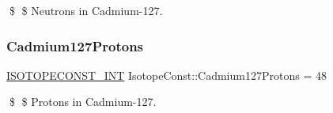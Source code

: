 \$ \$ Neutrons in Cadmium-\/127. \mbox{\label{group___isotope_const-_cadmium-_cd127_ga4a70e219d2e6454d00f8aaf7b61c1796}} 
\subsubsection{\texorpdfstring{Cadmium127\+Protons}{Cadmium127Protons}}
{\footnotesize\ttfamily \mbox{\hyperlink{group___isotope_const-_macros_ga5f18360b3e99483a35c32d789e62621c}{I\+S\+O\+T\+O\+P\+E\+C\+O\+N\+S\+T\+\_\+\+I\+NT}} Isotope\+Const\+::\+Cadmium127\+Protons = 48}

\$ \$ Protons in Cadmium-\/127. 